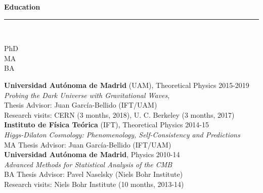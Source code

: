 \documentclass[11pt,a4paper]{article}
\newcommand{\secsize}{0.20\linewidth}
\newcommand{\secsizesmall}{0.05\linewidth}
\newcommand{\sectionsep}{12pt}
\begin{document}
\vspace{\sectionsep}
\textbf{Education} \vspace{-8pt}\\ {\rule{\linewidth}{0.6pt}}\vspace{5pt}\\
\begin{minipage}[t]{\secsizesmall}
\begin{flushleft}
\end{flushleft}
\end{minipage}
\begin{minipage}[t]{0.05\linewidth}%
\begin{flushleft}
PhD \\
\vspace{46pt}
MA \\
\vspace{32pt}
BA \\
\end{flushleft}
\end{minipage}
\begin{minipage}[t]{0.9\linewidth}
\begin{flushleft}
\textbf{Universidad Aut\'onoma de Madrid} (UAM), Theoretical Physics \hfill 2015-2019 \\
\emph{Probing the Dark Universe with Gravitational Waves}, \\
Thesis Advisor: Juan Garc\'ia-Bellido (IFT/UAM) \\ 
Research visits: CERN (3 months, 2018), U. C. Berkeley (3 months, 2017) \\
\vspace{5pt}
\textbf{Instituto de F\'isica Te\'orica} (IFT), Theoretical Physics  \hfill 2014-15 \\
\emph{Higgs-Dilaton Cosmology: Phenomenology, Self-Consistency and Predictions} \\
MA Thesis Advisor: Juan Garc\'ia-Bellido (IFT/UAM) \\
\vspace{5pt}
\textbf{Universidad Aut\'onoma de Madrid}, Physics  \hfill 2010-14 \\
\emph{Advanced Methods for Statistical Analysis of the CMB} \\
BA Thesis Advisor: Pavel Naselsky (Niels Bohr Institute) \\
Research visits: Niels Bohr Institute (10 months, 2013-14)
\end{flushleft}
\end{minipage}
\end{document}
